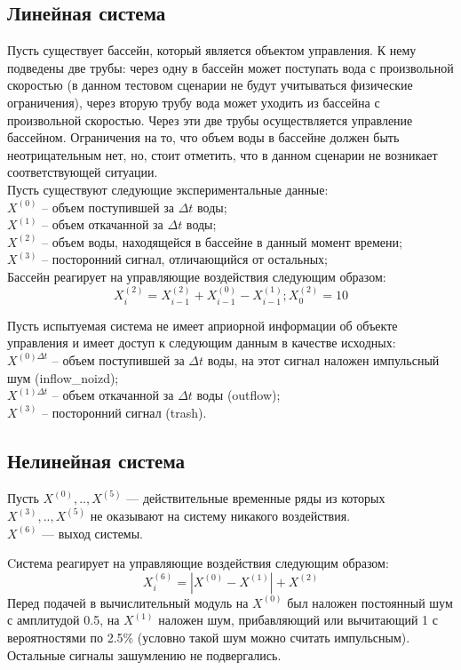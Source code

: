 \documentclass[utf8,usehyperref,14pt]{G7-32}
\begin{document}
\subsection{Линейная система}
Пусть существует бассейн, который является объектом управления. К нему подведены две трубы: через одну в бассейн может поступать вода с произвольной скоростью (в данном тестовом сценарии не будут учитываться физические ограничения), через вторую трубу вода может уходить из бассейна с произвольной скоростью. Через эти две трубы осуществляется управление бассейном. Ограничения на то, что объем воды в бассейне должен быть неотрицательным нет, но, стоит отметить, что в данном сценарии не возникает соответствующей ситуации.\\
Пусть существуют следующие экспериментальные данные:\\
$ X^{(0)} $ – объем поступившей за $ \Delta t $ воды;\\
$ X^{(1)} $ – объем откачанной за $ \Delta t $ воды;\\
$ X^{(2)} $ – объем воды, находящейся в бассейне в данный момент времени;\\
$ X^{(3)} $ – посторонний сигнал, отличающийся от остальных;\\
Бассейн реагирует на управляющие воздействия следующим образом:\\
\begin{equation}
X^{(2)}_{i} = X^{(2)}_{i-1} + X^{(0)}_{i-1} - X^{(1)}_{i-1}; X^{(2)}_{0}=10
\end{equation}


Пусть испытуемая система не имеет априорной информации об объекте управления и имеет доступ к следующим данным в качестве исходных:\\
$ X^{(0) \Delta t} $ – объем поступившей за $ \Delta t $ воды, на этот сигнал наложен импульсный шум (inflow\_noizd);\\
$ X^{(1) \Delta t} $ – объем откачанной за $ \Delta t $ воды (outflow);\\
$ X^{(3)} $ – посторонний сигнал (trash).\\
\subsection{Нелинейная система}
Пусть $ X^{(0)}, .., X^{(5)}$ --- действительные временные ряды из которых $ X^{(3)}, .., X^{(5)}$ не оказывают на систему никакого воздействия.\\
$ X^{(6)} $ --- выход системы.

Cистема реагирует на управляющие воздействия следующим образом:\\
\begin{equation}
X^{(6)}_{i} = |X^{(0)} - X^{(1)}| + X^{(2)}
\end{equation}
Перед подачей в вычислительный модуль на $ X^{(0)} $ был наложен постоянный шум с амплитудой 0.5, на $ X^{(1)} $ наложен шум, прибавляющий или вычитающий 1 с вероятностями по 2.5\% (условно такой шум можно считать импульсным). Остальные сигналы зашумлению не подвергались.
\end{document}
